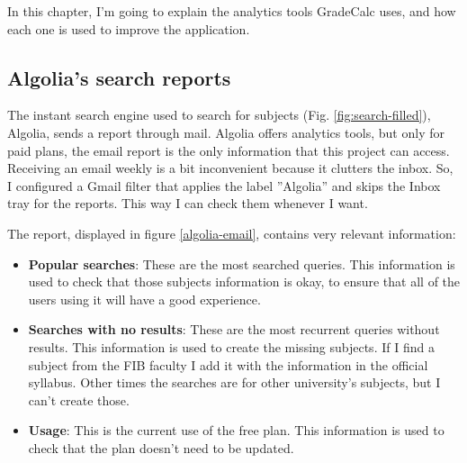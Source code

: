 In this chapter, I'm going to explain the analytics tools GradeCalc uses, and how each one is used to improve the application.

\subsection{Algolia's search reports}

The instant search engine used to search for subjects (Fig. \ref{fig:search-filled}), Algolia, sends a report through mail. Algolia offers analytics tools, but only for paid plans, the email report is the only information that this project can access. Receiving an email weekly is a bit inconvenient because it clutters the inbox. So, I configured a Gmail filter that applies the label ''Algolia'' and skips the Inbox tray for the reports. This way I can check them whenever I want.

\noindent
The report, displayed in figure \ref{algolia-email}, contains very relevant information:
\begin{itemize}[noitemsep]
    \item \textbf{Popular searches}: These are the most searched queries. This information is used to check that those subjects information is okay, to ensure that all of the users using it will have a good experience.
    \item \textbf{Searches with no results}: These are the most recurrent queries without results. This information is used to create the missing subjects. If I find a subject from the FIB faculty I add it with the information in the official syllabus. Other times the searches are for other university's subjects, but I can't create those. %
    \item \textbf{Usage}: This is the current use of the free plan. This information is used to check that the plan doesn't need to be updated.
\end{itemize}

